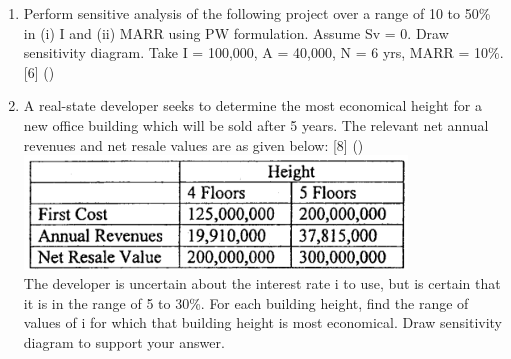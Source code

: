 \documentclass[12pt]{article}
\begin{document}
\begin{enumerate}
			\item Perform sensitive analysis of the following project over a range of 10 to 50\% in (i) I and (ii) MARR using PW formulation. Assume Sv = 0. Draw sensitivity diagram. Take I = 100,000, A = 40,000, N = 6 yrs, MARR = 10\%. \hfill [6] ()

			\item A real-state developer seeks to determine the most economical height for a new office building which will be sold after 5 years. The relevant net annual revenues and net resale values are as given below: \hfill [8] ()\\
			\includegraphics[width=4in]{./pics/ee_8}\\
			The developer is uncertain about the interest rate i to use, but is certain that it is in the range of 5 to 30\%. For each building height, find the range of values of i for which that building height is most economical. Draw sensitivity diagram to support your answer.

		\end{enumerate}
\end{document}
